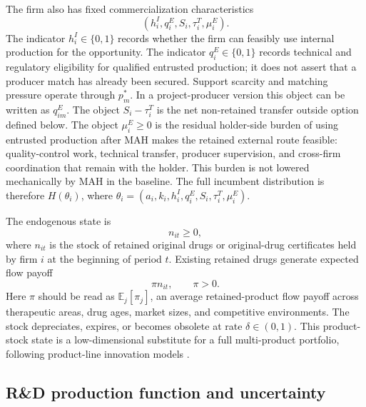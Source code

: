 \documentclass[12pt]{article}
\newcommand{\E}{\mathbb{E}}
\newcommand{\1}{\mathbf{1}}
\begin{document}
The firm also has fixed commercialization characteristics
\[
    (h_i^I,q_i^E,S_i,\tau_i^T,\mu_i^E).
\]
The indicator $h_i^I\in\{0,1\}$ records whether the firm can feasibly use internal production for the opportunity. The indicator $q_i^E\in\{0,1\}$ records technical and regulatory eligibility for qualified entrusted production; it does not assert that a producer match has already been secured. Support scarcity and matching pressure operate through $p_m^*$. In a project-producer version this object can be written as $q_{im}^E$. The object $S_i-\tau_i^T$ is the net non-retained transfer outside option defined below. The object $\mu_i^E\ge0$ is the residual holder-side burden of using entrusted production after MAH makes the retained external route feasible: quality-control work, technical transfer, producer supervision, and cross-firm coordination that remain with the holder. This burden is not lowered mechanically by MAH in the baseline. The full incumbent distribution is therefore $H(\theta_i)$, where $\theta_i=(a_i,k_i,h_i^I,q_i^E,S_i,\tau_i^T,\mu_i^E)$.

The endogenous state is
\begin{equation}
    n_{it}\ge0,
    \label{eq:state}
\end{equation}
where $n_{it}$ is the stock of retained original drugs or original-drug certificates held by firm $i$ at the beginning of period $t$. Existing retained drugs generate expected flow payoff
\begin{equation}
    \pi n_{it},\qquad \pi>0.
    \label{eq:oldflow}
\end{equation}
Here $\pi$ should be read as $\E_j[\pi_j]$, an average retained-product flow payoff across therapeutic areas, drug ages, market sizes, and competitive environments. The stock depreciates, expires, or becomes obsolete at rate $\delta\in(0,1)$. This product-stock state is a low-dimensional substitute for a full multi-product portfolio, following product-line innovation models \citep{KletteKortum2004}.

\subsection{R\&D production function and uncertainty}
\end{document}
